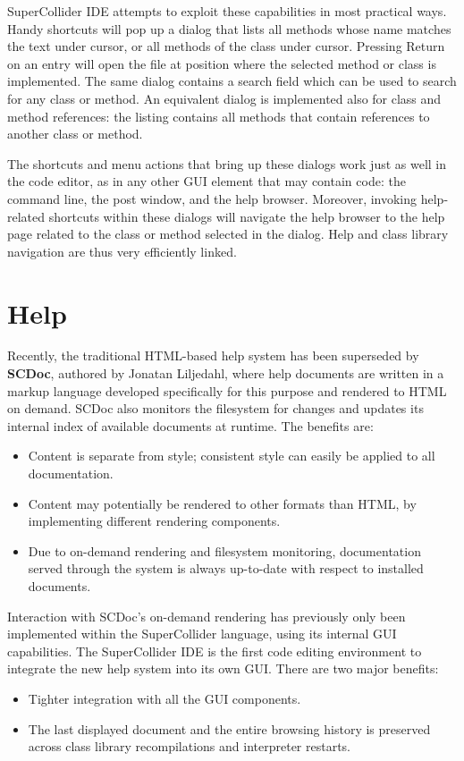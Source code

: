 \documentclass[11pt,a4paper]{article}
\begin{document}
SuperCollider IDE attempts to exploit these capabilities in most practical ways. Handy shortcuts
will pop up a dialog that lists all methods whose name matches the text under cursor, or all methods
of the class under cursor. Pressing Return on an entry will open the file at position where the
selected method or class is implemented. The same dialog contains a search field which can be used
to search for any class or method. An equivalent dialog is implemented also for class and method references:
the listing contains all methods that contain references to another class or method.

The shortcuts and menu actions that bring up these dialogs work just as well in the code editor,
as in any other GUI element that may contain code: the command line, the post window, and the help
browser. Moreover, invoking help-related shortcuts within these dialogs will navigate the help browser to the
help page related to the class or method selected in the dialog. Help and class library navigation
are thus very efficiently linked.

\section{Help}

Recently, the traditional HTML-based help system has been superseded by \textbf{SCDoc}, authored by Jonatan Liljedahl,
where help documents are written in a markup language developed specifically for this purpose and rendered to HTML on
demand. SCDoc also monitors the filesystem for changes and updates its internal index of available documents at runtime.
The benefits are:
\begin{itemize}
 \item Content is separate from style; consistent style can easily be applied to all documentation.
 \item Content may potentially be rendered to other formats than HTML, by implementing different rendering components.
 \item Due to on-demand rendering and filesystem monitoring, documentation served through the system is always
up-to-date with respect to installed documents.
\end{itemize}

Interaction with SCDoc's on-demand rendering has previously only been implemented within the SuperCollider language,
using its internal GUI capabilities. The SuperCollider IDE is the first code editing environment to integrate the new
help system into its own GUI. There are two major benefits:
\begin{itemize}
 \item Tighter integration with all the GUI components.
 \item The last displayed document and the entire browsing history is preserved across class library recompilations and
interpreter restarts.
\end{itemize}
\end{document}
